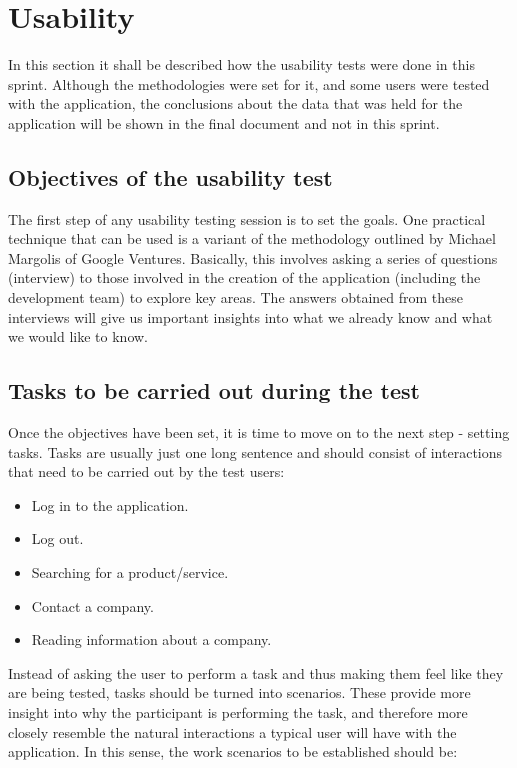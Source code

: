 \documentclass[./main.tex]{subfiles}
\begin{document}
\section{Usability}
In this section it shall be described how the usability tests were done in this sprint. Although the methodologies were set for it, and some users were tested  with the application, the conclusions about the data that was held for the application will be shown in the final document and not in this sprint.
\subsection{Objectives of the usability test}
The first step of any usability testing session is to set the goals. One practical technique that can be used is a variant of the methodology outlined by Michael Margolis of Google Ventures. Basically, this involves asking a series of questions (interview) to those involved in the creation of the application (including the development team) to explore key areas.
The answers obtained from these interviews will give us important insights into what we already know and what we would like to know.

\subsection{Tasks to be carried out during the test}
Once the objectives have been set, it is time to move on to the next step - setting tasks. Tasks are usually just one long sentence and should consist of interactions that need to be carried out by the test users:

\begin{itemize}
	\item Log in to the application.
	\item Log out.
	\item Searching for a product/service.
	\item Contact a company.
	\item Reading information about a company.
\end{itemize}

Instead of asking the user to perform a task and thus making them feel like they are being tested, tasks should be turned into scenarios. These provide more insight into why the participant is performing the task, and therefore more closely resemble the natural interactions a typical user will have with the application.
In this sense, the work scenarios to be established should be:
\end{document}

